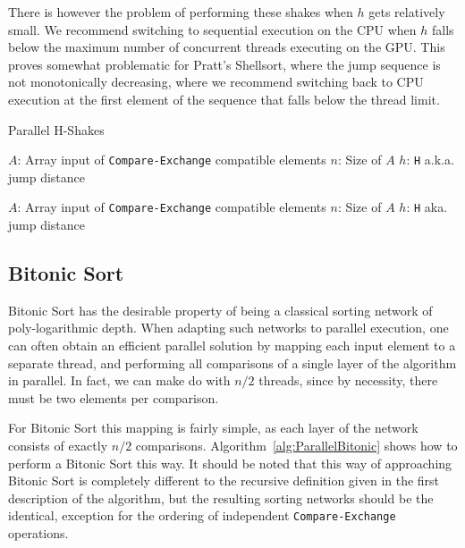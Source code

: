 There is however the problem of performing these shakes when $h$ gets relatively small. We recommend switching to sequential execution on the CPU when $h$ falls below the maximum number of concurrent threads executing on the GPU. This proves somewhat problematic for Pratt's Shellsort, where the jump sequence is not monotonically decreasing, where we recommend switching back to CPU execution at the first element of the sequence that falls below the thread limit. 

\begin{algorithm}
\caption{Parallel H-Shakes}\label{alg:ParallellHShakes}
\begin{algorithmic}[1]
	\Statex $A$: Array input of \texttt{Compare-Exchange} compatible elements
	\Statex $n$: Size of $A$
	\Statex $h$: \texttt{H} a.k.a. jump distance
\EndProcedure

\item[]

	\Statex $A$: Array input of \texttt{Compare-Exchange} compatible elements
	\Statex $n$: Size of $A$
	\Statex $h$: \texttt{H} aka. jump distance
\EndWhile
\EndProcedure
\end{algorithmic}
\end{algorithm}

\subsection{Bitonic Sort}

Bitonic Sort has the desirable property of being a classical sorting network of poly-logarithmic depth. When adapting such networks to parallel execution, one can often obtain an efficient parallel solution by mapping each input element to a separate thread, and performing all comparisons of a single layer of the algorithm in parallel. In fact, we can make do with $n/2$ threads, since by necessity, there must be two elements per comparison.

For Bitonic Sort this mapping is fairly simple, as each layer of the network consists of exactly $n/2$ comparisons. Algorithm~\ref{alg:ParallelBitonic} shows how to perform a Bitonic Sort this way. It should be noted that this way of approaching Bitonic Sort is completely different to the recursive definition given in the first description of the algorithm, but the resulting sorting networks should be the identical, exception for the ordering of independent \texttt{Compare-Exchange} operations.

